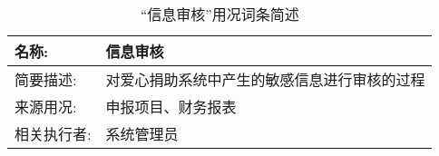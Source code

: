 \begin{table}[H]  
\caption{“信息审核”用况词条简述}  
\begin{center}  
    \begin{tabular}{l p{11cm}} 
        \hline
        \quad 名称:  & 信息审核 \\
        \hline
        \quad 简要描述:  & 对爱心捐助系统中产生的敏感信息进行审核的过程 \\
        \hline
        \quad 来源用况:  & 申报项目、财务报表 \\
        \hline
        \quad 相关执行者:  & 系统管理员 \\
        \hline
    \end{tabular}
    \label{tab1}
\end{center}
\end{table}